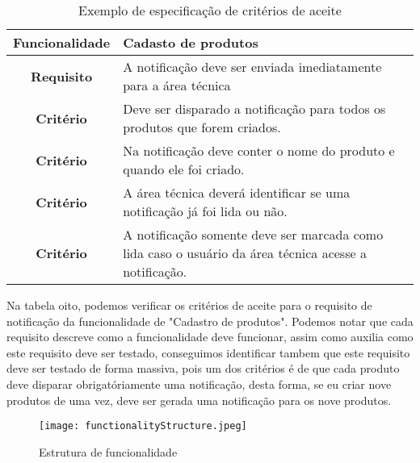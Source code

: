       \begin{table}[h!]
        \centering
        \begin{tabular}{|c|p{10cm}|}
          \hline
          \textbf{Funcionalidade} &
          Cadasto de produtos \\ \hline
          \textbf{Requisito} &
          A notificação deve ser enviada imediatamente para a área técnica \\ \hline
          \textbf{Critério} &
          Deve ser disparado a notificação para todos os produtos que forem criados. \\ \hline
          \textbf{Critério} &
          Na notificação deve conter o nome do produto e quando ele foi criado. \\ \hline
          \textbf{Critério} &
          A área técnica deverá identificar se uma notificação já foi lida ou não. \\ \hline
          \textbf{Critério} &
          A notificação somente deve ser marcada como lida caso o usuário da área
          técnica acesse a notificação. \\ \hline
        \end{tabular}
        \caption{Exemplo de especificação de critérios de aceite}
        \label{Tabela:8}
      \end{table}

      Na tabela oito, podemos verificar os critérios de aceite para o requisito de
      notificação da funcionalidade de "Cadastro de produtos". Podemos notar que cada
      requisito descreve como a funcionalidade deve funcionar, assim como auxilia
      como este requisito deve ser testado, conseguimos identificar tambem que este
      requisito deve ser testado de forma massiva, pois um dos critérios é de que
      cada produto deve disparar obrigatóriamente uma notificação, desta forma, se
      eu criar nove produtos de uma vez, deve ser gerada uma notificação para os
      nove produtos. \newline

      \begin{figure}[!h]
        \centering
        \texttt{[image: functionalityStructure.jpeg]}
        \caption{Estrutura de funcionalidade}
        \label{Imagem:1}
      \end{figure}


